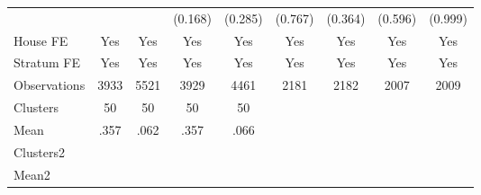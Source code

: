 {\begin{tabular}{l*{8}{c}}
                &                  &                  &  (0.168)         &  (0.285)         &  (0.767)         &  (0.364)         &  (0.596)         &  (0.999)         \\
House FE        &      Yes         &      Yes         &      Yes         &      Yes         &      Yes         &      Yes         &      Yes         &      Yes         \\
Stratum FE      &      Yes         &      Yes         &      Yes         &      Yes         &      Yes         &      Yes         &      Yes         &      Yes         \\
\midrule
Observations    &     3933         &     5521         &     3929         &     4461         &     2181         &     2182         &     2007         &     2009         \\
Clusters        &       50         &       50         &       50         &       50         &                  &                  &                  &                  \\
Mean            &     .357         &     .062         &     .357         &     .066         &                  &                  &                  &                  \\
Clusters2       &                  &                  &                  &                  &                  &                  &                  &                  \\
Mean2           &                  &                  &                  &                  &                  &                  &                  &                  \\
\bottomrule
\end{tabular}
}
